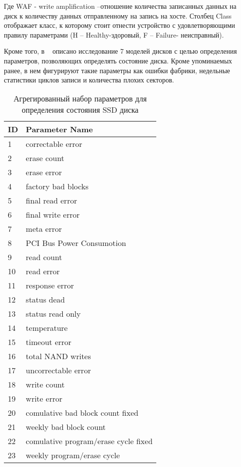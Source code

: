 Где WAF - write amplification –отношение количества записанных данных на диск к количеству данных отправленному на запись на хосте.
Столбец Class отображает класс, к которому стоит отнести устройство с удовлетворяющими правилу параметрами (H – Healthy-здоровый, F – Failure- неисправный).

Кроме того, в  ~\cite{errorpredr} описано исследование 7 моделей дисков с целью определения параметров, позволяющих определять состояние диска. Кроме упоминаемых ранее, в нем фигурируют такие параметры как ошибки фабрики, недельные статистики циклов записи и количества плохих секторов.
\begin{table}
	\captionsetup{skip=5pt}
	\caption{Агрегированный набор параметров 
		для определения состояния SSD диска}
	\centering
	\begin{tabular}{ | l | l | }
		\hline
		ID & Parameter Name \\ \hline
		1 & correctable error  \\
		2 & erase count \\
		3 & erase error \\
		4 & factory bad blocks\\
		5 & final read error\\
		6 & final write error\\
		7 & meta error\\
		8 & PCI Bus Power Consumotion\\
		9 & read count\\
		10 & read error\\
		11 & response error\\
		12 & status dead\\
		13 & status read only\\
		14 & temperature\\
		15 & timeout error\\
		16 & total NAND writes\\
		17 & uncorrectable error\\
		18 & write count\\
		19 & write error\\
		20 & comulative bad block count fixed\\
		21 & weekly bad block count\\
		22 & comulative program/erase cycle fixed\\
		23 & weekly program/erase cycle\\
		\hline
	\end{tabular}
	\label{table:tab1}
\end{table}

